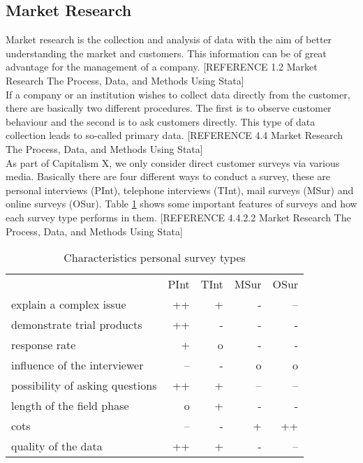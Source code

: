 \subsection{Market Research} \label{market_research_simulation}


Market research is the collection and analysis of data with the aim of better understanding the market and customers. This information can be of great advantage for the management of a company. [REFERENCE 1.2 Market Research The Process, Data, and Methods Using Stata] \\

If a company or an institution wishes to collect data directly from the customer, there are basically two different procedures. The first is to observe customer behaviour and the second is to ask customers directly. This type of data collection leads to so-called primary data. [REFERENCE 4.4 Market Research The Process, Data, and Methods Using Stata] \\

As part of Capitalism X, we only consider direct customer surveys via various media. Basically there are four different ways to conduct a survey, these are personal interviews (\gls{PInt}), telephone interviews (\gls{TInt}), mail surveys (\gls{MSur}) and online surveys (\gls{OSur}). Table \ref{MR_survey_types_characteristics} shows some important features of surveys and how each survey type performs in them. [REFERENCE 4.4.2.2 Market Research The Process, Data, and Methods Using Stata] \\

\begin{table}[ht]
\centering
\begin{tabular}{|l|r|r|r|r|}
\hline
                                & PInt    & TInt    & MSur   & OSur \\
explain a complex issue         & ++    & +     & -    & --  \\
demonstrate trial products      & ++    & -     & -    & -   \\
response rate                   & +     & o     & -    & -   \\
influence of the interviewer    & --    & -     & o    & o   \\
possibility of asking questions & ++    & +     & --   & --  \\
length of the field phase       & o     & +     & -    & -   \\
cots                            & --    & -     & +    & ++  \\
quality of the data             & ++    & +     & -    & --  \\
\hline
\end{tabular}
\caption{Characteristics personal survey types}
\label{MR_survey_types_characteristics}
\end{table}

